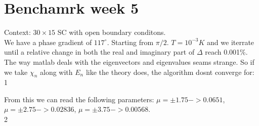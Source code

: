 \documentclass[../main.tex]{subfiles}
\begin{document}
\section{Benchamrk week 5}
Context: $30\times 15$ SC with open boundary conditons.\\

We have a phase gradient of $117^{\circ}$. Starting from $\pi/2$. $T=10^{-3}K$ and we iterrate until a relative
change in both the real and imaginary part of $\Delta$ reach 0.001\%. \\

The way matlab deals with the eigenvectors and eigenvalues seams strange. So if we take $\chi_n$ along with $E_n$
like the theory does, the algorithm dosnt converge for: 
1
\begin{figure}[H]
    \centering
    
    \caption{}
\end{figure}
From this we can read the following parameters: $\mu = \pm 1.75 -> 0.0651$, $\mu = \pm 2.75 -> 0.02836$, $\mu = \pm 3.75 -> 0.00568$.
\\

2
\begin{figure}[H]
    \centering
    
    \caption{}
\end{figure}
\end{document}
